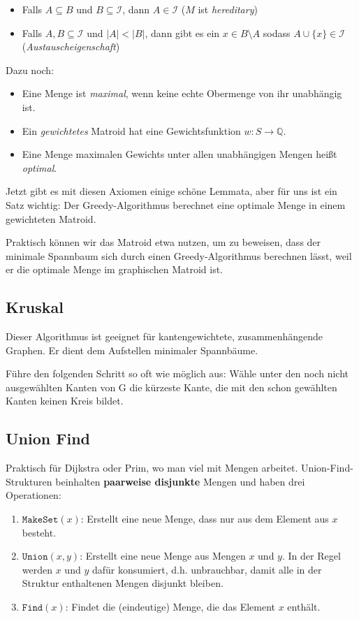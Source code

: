 \documentclass[11pt]{scrartcl}
\begin{document}
\begin{itemize}
\item Falls $A \subseteq B$ und $B \subseteq \mathcal{I}$, dann $A \in \mathcal{I}$ ($M$ ist \textit{hereditary})
\item Falls $A, B \subseteq \mathcal{I}$ und $|A| < |B|$, dann gibt es ein $x \in B \setminus A$ sodass $A \cup \{x\} \in \mathcal{I}$ (\textit{Austauscheigenschaft})
\end{itemize}

Dazu noch:
\begin{itemize}
\item Eine Menge ist \textit{maximal}, wenn keine echte Obermenge von ihr unabhängig ist.
\item Ein \textit{gewichtetes} Matroid hat eine Gewichtsfunktion $w : S \to \mathbb{Q}$.
\item Eine Menge maximalen Gewichts unter allen unabhängigen Mengen heißt \textit{optimal}.
\end{itemize}

Jetzt gibt es mit diesen Axiomen einige schöne Lemmata, aber für uns ist ein Satz wichtig: Der Greedy-Algorithmus berechnet eine optimale Menge in einem gewichteten Matroid.

Praktisch können wir das Matroid etwa nutzen, um zu beweisen, dass der minimale Spannbaum sich durch einen Greedy-Algorithmus berechnen lässt, weil er die optimale Menge im graphischen Matroid ist.

\subsection{Kruskal}
Dieser Algorithmus ist geeignet für kantengewichtete, zusammenhängende Graphen. Er dient dem Aufstellen minimaler Spannbäume.

Führe den folgenden Schritt so oft wie möglich aus: Wähle unter den noch nicht ausgewählten Kanten von G die kürzeste Kante, die mit den schon gewählten Kanten keinen Kreis bildet.

\subsection{Union Find}

Praktisch für Dijkstra oder Prim, wo man viel mit Mengen arbeitet.
Union-Find-Strukturen beinhalten \textbf{paarweise disjunkte} Mengen und haben drei Operationen:

\begin{enumerate}
\item $\texttt{MakeSet}(x)$: Erstellt eine neue Menge, dass nur aus dem Element aus $x$ besteht.
\item $\texttt{Union}(x,y)$: Erstellt eine neue Menge aus Mengen $x$ und $y$. In der Regel werden $x$ und $y$ dafür konsumiert, d.h. unbrauchbar, damit alle in der Struktur enthaltenen Mengen disjunkt bleiben.
\item $\texttt{Find}(x)$: Findet die (eindeutige) Menge, die das Element $x$ enthält.
\end{enumerate}
\end{document}
